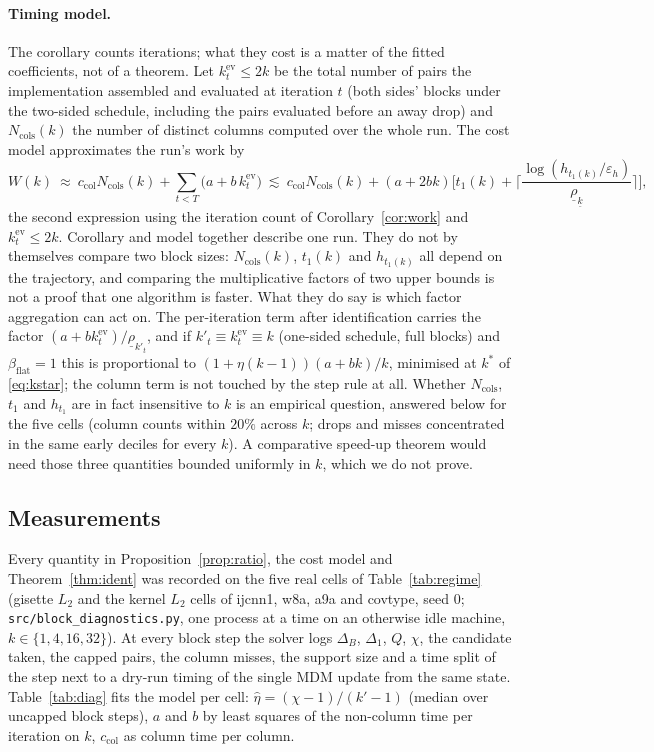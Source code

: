 \paragraph{Timing model.} The corollary counts iterations; what they
cost is a matter of the fitted coefficients, not of a theorem. Let
$k^{\mathrm{ev}}_t\le2k$ be the total number of pairs the implementation
assembled and evaluated at iteration $t$ (both sides' blocks under the
two-sided schedule, including the pairs evaluated before an away drop)
and $N_{\mathrm{cols}}(k)$ the number of distinct columns computed over
the whole run. The cost model approximates the run's work by
\[
W(k)\ \approx\ c_{\mathrm{col}}N_{\mathrm{cols}}(k)+\sum_{t<T}\big(a+b\,k^{\mathrm{ev}}_t\big)
\ \lesssim\ c_{\mathrm{col}}N_{\mathrm{cols}}(k)+(a+2bk)\Big[t_1(k)+\Big\lceil\frac{\log(h_{t_1(k)}/\varepsilon_h)}{\underline\rho_{\underline k}}\Big\rceil\Big],
\]
the second expression using the iteration count of
Corollary~\ref{cor:work} and $k^{\mathrm{ev}}_t\le2k$.
Corollary and model together describe one run. They do not by
themselves compare two block sizes: $N_{\mathrm{cols}}(k)$, $t_1(k)$ and
$h_{t_1(k)}$ all depend on the trajectory, and comparing the
multiplicative factors of two upper bounds is not a proof that one
algorithm is faster. What they do say is which factor aggregation can act
on. The per-iteration term after identification carries the factor
$(a+bk^{\mathrm{ev}}_t)/\underline\rho_{k'_t}$, and if
$k'_t\equiv k^{\mathrm{ev}}_t\equiv k$ (one-sided schedule, full blocks)
and $\beta_{\mathrm{flat}}=1$ this is proportional to
$(1+\eta(k-1))(a+bk)/k$, minimised at $k^*$ of
\eqref{eq:kstar}; the column term is not touched by the step rule at
all. Whether $N_{\mathrm{cols}}$, $t_1$ and $h_{t_1}$ are in fact
insensitive to $k$ is an empirical question, answered below for the
five cells (column counts within $20\%$ across $k$; drops and misses
concentrated in the same early deciles for every $k$). A comparative
speed-up theorem would need those three quantities bounded uniformly in
$k$, which we do not prove.

\subsection{Measurements}\label{sec:pay-meas}

Every quantity in Proposition~\ref{prop:ratio}, the cost model and
Theorem~\ref{thm:ident} was recorded on the five real cells of
Table~\ref{tab:regime} (gisette $L_2$ and the kernel $L_2$ cells of
ijcnn1, w8a, a9a and covtype, seed 0; \texttt{src/block\_diagnostics.py}, one process at a time on an
otherwise idle machine, $k\in\{1,4,16,32\}$). At every block step the
solver logs $\Delta_B$, $\Delta_1$, $Q$, $\chi$, the candidate taken,
the capped pairs, the column misses, the support size and a time split
of the step next to a dry-run timing of the single MDM update from the
same state. Table~\ref{tab:diag} fits the model per cell:
$\hat\eta=(\chi-1)/(k'-1)$ (median over uncapped block steps), $a$ and
$b$ by least squares of the non-column time per iteration on $k$,
$c_{\mathrm{col}}$ as column time per column.


